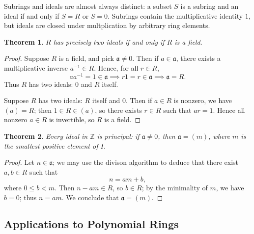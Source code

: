 \documentclass[11pt]{article}
\newtheorem{theorem}{Theorem}
\begin{document}
Subrings and ideals are almost always distinct: a subset $S$ is a subring and an ideal if and only if $S = R$ or $S = 0$. Subrings contain the multiplicative identity $1$, but ideals are closed under multplication by arbitrary ring elements.

\begin{theorem}
	$R$ has precisely two ideals if and only if $R$ is a field.
\end{theorem}
\begin{adjustwidth}{0.5cm}{}
	\begin{proof}
		Suppose $R$ is a field, and pick $\mathfrak{a} \ne 0$. Then if $a \in \mathfrak{a}$, there exists a multiplicative inverse $a^{-1} \in R$. Hence, for all $r \in R$,
		\[
			a a^{-1} = 1 \in \mathfrak{a} \implies r 1 = r \in \mathfrak{a} \implies \mathfrak{a} = R.
		\]
		Thus $R$ has two ideals: $0$ and $R$ itself.

		Suppose $R$ has two ideals: $R$ itself and $0$. Then if $a \in R$ is nonzero, we have $(a) = R$; then $1 \in R \in (a)$, so there exists $r \in R$ such that $ar = 1$. Hence all nonzero $a \in R$ is invertible, so $R$ is a field.
	\end{proof}
\end{adjustwidth}

\newpage

\begin{theorem}
	Every ideal in $\mathbb{Z}$ is principal: if $\mathfrak{a} \ne 0$, then $\mathfrak{a} = (m)$, where $m$ is the smallest positive element of $I$.
\end{theorem}
\begin{adjustwidth}{0.5cm}{}
	\begin{proof}
		Let $n \in \mathfrak{a}$; we may use the divison algorithm to deduce that there exist $a, b \in R$ such that
		\[
			n = am + b,
		\]
		where $0 \le b < m$. Then $n - am \in R$, so $b \in R$; by the minimality of $m$, we have $b = 0$; thus $n = am$. We conclude that $\mathfrak{a} = (m)$.
	\end{proof}
\end{adjustwidth}


\subsection{Applications to Polynomial Rings}
\end{document}
